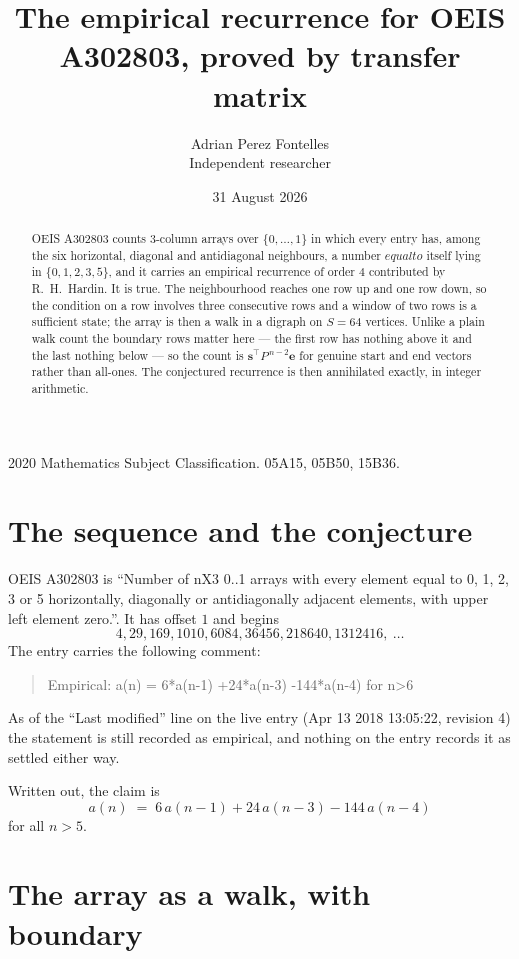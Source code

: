 \documentclass[11pt,a4paper]{article}
\title{The empirical recurrence for OEIS A302803, proved by transfer matrix}
\author{Adrian Perez Fontelles\\ \small Independent researcher}
\date{31 August 2026}
\theoremstyle{plain}
\theoremstyle{definition}
\begin{document}
\maketitle

\begin{abstract}
OEIS A302803 counts $3$-column arrays over $\{0,\dots,1\}$ in which every entry has,
among the six horizontal, diagonal and antidiagonal neighbours, a number $equal to$ itself lying in $\{0,1,2,3,5\}$, and it carries an empirical
recurrence of order $4$ contributed by R.~H.~Hardin. It is true. The neighbourhood
reaches one row up and one row down, so the condition on a row involves three consecutive
rows and a window of two rows is a sufficient state; the array is then a walk in a digraph
on $S=64$ vertices. Unlike a plain walk count the boundary rows matter here --- the first
row has nothing above it and the last nothing below --- so the count is
$\mathbf{s}^{\!\top}P^{\,n-2}\mathbf{e}$ for genuine start and end vectors rather than
all-ones. The conjectured recurrence is then annihilated exactly, in integer arithmetic.
\end{abstract}

\noindent\small 2020 Mathematics Subject Classification. 05A15, 05B50, 15B36.\normalsize

\section{The sequence and the conjecture}

OEIS A302803 is ``Number of nX3 0..1 arrays with every element equal to 0, 1, 2, 3 or 5 horizontally, diagonally or antidiagonally adjacent elements, with upper left element zero.''. It has offset
$1$ and begins
\[
4, 29, 169, 1010, 6084, 36456, 218640, 1312416,\ \dots
\]
The entry carries the following comment:
\begin{quote}\small
Empirical: a(n) = 6*a(n-1) +24*a(n-3) -144*a(n-4) for n>6
\end{quote}
As of the ``Last modified'' line on the live entry (Apr 13 2018 13:05:22, revision
4) the statement is still recorded as empirical, and nothing on the entry
records it as settled either way.

Written out, the claim is
\begin{equation}\label{eq:conj}
a(n)\;=\;6\,a(n-1) + 24\,a(n-3) - 144\,a(n-4)
\end{equation}
for all $n>5$.

\section{The array as a walk, with boundary}
\end{document}
